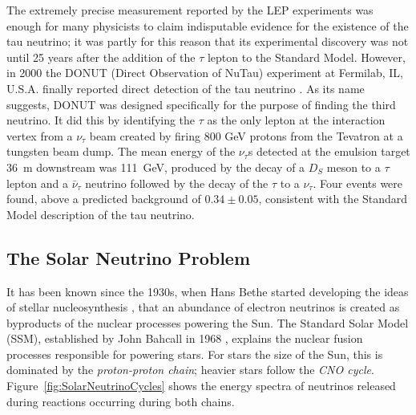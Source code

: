 The extremely precise measurement reported by the LEP experiments was enough for many physicists to claim indisputable evidence for the existence of the tau neutrino; it was partly for this reason that its experimental discovery was not until 25 years after the addition of the $\tau$ lepton to the Standard Model.  However, in 2000 the DONUT (Direct Observation of NuTau) experiment at Fermilab, IL, U.S.A. finally reported direct detection of the tau neutrino \cite{Kodama2001}.  As its name suggests, DONUT was designed specifically for the purpose of finding the third neutrino.  It did this by identifying the $\tau$ as the only lepton at the interaction vertex from a $\nu_{\tau}$ beam created by firing 800 GeV protons from the Tevatron at a tungsten beam dump.  The mean energy of the $\nu_{\tau}$s detected at the emulsion target 36~m downstream was 111~GeV, produced by the decay of a $D_S$ meson to a $\tau$ lepton and a $\bar{\nu}_{\tau}$ neutrino followed by the decay of the $\tau$ to a $\nu_{\tau}$.  Four events were found, above a predicted background of $0.34\pm0.05$, consistent with the Standard Model description of the tau neutrino.

\subsection{The Solar Neutrino Problem}\label{SolarNeutrinoProblem}

It has been known since the 1930s, when Hans Bethe started developing the ideas of stellar nucleosynthesis \cite{Bethe1939}, that an abundance of electron neutrinos is created as byproducts of the nuclear processes powering the Sun.  The Standard Solar Model (SSM), established by John Bahcall in 1968 \cite{Bahcall1968}, explains the nuclear fusion processes responsible for powering stars.  For stars the size of the Sun, this is dominated by the \textit{proton-proton chain}; heavier stars follow the \textit{CNO cycle}.  Figure~\ref{fig:SolarNeutrinoCycles} shows the energy spectra of neutrinos released during reactions occurring during both chains.

